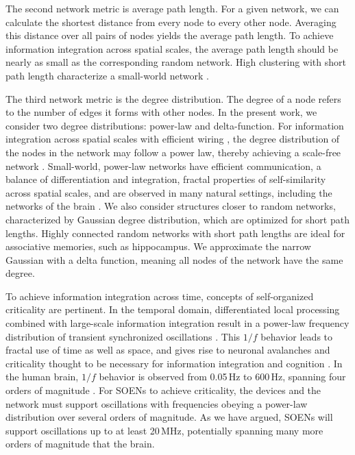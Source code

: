 \documentclass[twocolumn]{article}
\begin{document}
The second network metric is average path length. For a given network, we can calculate the shortest distance from every node to every other node. Averaging this distance over all pairs of nodes yields the average path length. To achieve information integration across spatial scales, the average path length should be nearly as small as the corresponding random network. High clustering with short path length characterize a small-world network \cite{wast1998}. 

The third network metric is the degree distribution. The degree of a node refers to the number of edges it forms with other nodes. In the present work, we consider two degree distributions: power-law and delta-function. For information integration across spatial scales with efficient wiring \cite{busp2012}, the degree distribution of the nodes in the network may follow a power law, thereby achieving a scale-free network \cite{baal1999}. Small-world, power-law networks have efficient communication, a balance of differentiation and integration, fractal properties of self-similarity across spatial scales, and are observed in many natural settings, including the networks of the brain \cite{egch2005}. We also consider structures closer to random networks, characterized by Gaussian degree distribution, which are optimized for short path lengths. Highly connected random networks with short path lengths are ideal for associative memories, such as hippocampus. We approximate the narrow Gaussian with a delta function, meaning all nodes of the network have the same degree. 

To achieve information integration across time, concepts of self-organized criticality \cite{bata1987,yara2017} are pertinent. In the temporal domain, differentiated local processing combined with large-scale information integration result in a power-law frequency distribution of transient synchronized oscillations \cite{budr2004,bu2006}. This $1/f$ behavior leads to fractal use of time as well as space, and gives rise to neuronal avalanches \cite{be2007} and criticality thought to be necessary for information integration and cognition \cite{be2007,kism2009,shya2009,rusp2011}. In the human brain, $1/f$ behavior is observed from 0.05\,Hz to 600\,Hz, spanning four orders of magnitude \cite{budr2004,bu2006}. For SOENs to achieve criticality, the devices and the network must support oscillations with frequencies obeying a power-law distribution \cite{bu2006} over several orders of magnitude. As we have argued, SOENs will support oscillations up to at least 20\,MHz, potentially spanning many more orders of magnitude that the brain. 
\end{document}
